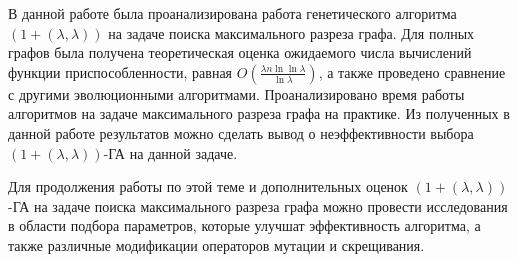 \documentclass[times]{itmo-student-thesis}
\newcommand{\alglambda}{${(1 + (\lambda , \lambda))}$\xspace}
\newcommand{\alglambdaf}{${(1 + (\lambda , \lambda))}$-ГА\xspace}
\begin{document}
\finishrelatedwork

\startconclusionpage
В данной работе была проанализирована работа генетического алгоритма \alglambda на задаче поиска максимального разреза графа. Для полных графов была получена теоретическая оценка ожидаемого числа вычислений функции приспособленности, равная $O\left(\frac{\lambda n\ln \ln \lambda}{\ln \lambda}\right)$, а также проведено сравнение с другими эволюционными алгоритмами.
Проанализировано время работы алгоритмов на задаче максимального разреза графа на практике.
Из полученных в данной работе результатов можно сделать вывод о неэффективности выбора \alglambdaf на данной задаче.

Для продолжения работы по этой теме и дополнительных оценок \alglambdaf на задаче поиска максимального разреза графа можно провести исследования в области подбора параметров, которые улучшат эффективность алгоритма, а также различные модификации операторов мутации и скрещивания.

\printmainbibliography

\appendix
\end{document}
